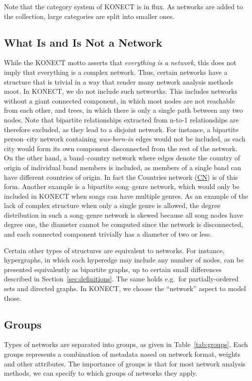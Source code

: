 \documentclass{article}
\begin{document}
Note that the category system of KONECT is in flux.  As networks are
added to the collection, large categories are split into smaller ones. 

\subsection{What Is and Is Not a Network}
While the KONECT motto asserts that \emph{everything is a network}, this
does not imply that everything is a complex network.  Thus, certain networks
have a structure that is trivial in a way that render many network
analysis methods moot.  In KONECT, 
we do not include such networtks.
This includes networks without a giant connected component,
in which most nodes are not reachable from each other, and trees, in
which there is only a single path between any two nodes.  Note that
bipartite relationships extracted from n-to-1 relationships are
therefore excluded, as they lead to a disjoint network. For instance, a
bipartite person--city network containing \emph{was-born-in} edges would
not be included, as each city would form its own component disconnected
from the rest of the network.  On the other hand, a band--country
network where edges denote the country of origin of individual band
members is included, as members of a single band can have different
countries of origin. In fact the Countries network
(\href{http://konect.cc/networks/dbpedia-country/}{\textsf{CN}})
is of this form.  Another example is a bipartite song--genre network,
which would only be included in KONECT when songs can have multiple
genres.  As an example of the lack of complex structure when only a
single genre is allowed, the degree distribution in such a song--genre
network is skewed because all song nodes have degree one, the diameter
cannot be computed since the network is disconnected, and each connected
component trivially has a diameter of two or less.

Certain other types of structures are equivalent to networks.  For
instance, hypergraphs, in which each hyperedge may include any number of
nodes, can be presented equivalently as bipartite graphs, up to certain
small differences described in Section~\ref{sec:definitions}.  The same holds e.g.\ for partially-ordered sets and
directed graphs.  In KONECT, we choose the ``network'' aspect to model those. 

\subsection{Groups}
\label{sec:groups}
Types of networks are separated into groups, as given in
Table~\ref{tab:groups}.
Each groups represents a combination of metadata nased on network
format, weights and other attributes.  The importance of groups is that
for most network analysis methods, we can specify to which groups of
networks they apply. 
\end{document}
